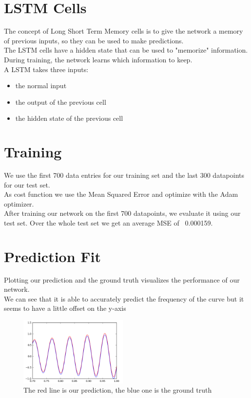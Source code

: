 \documentclass[twoside, twocolumn]{article}
\begin{document}

\section{LSTM Cells}
The concept of Long Short Term Memory cells is to give the network a memory of previous inputs, so they can be used to make predictions. \\
The LSTM cells have a hidden state that can be used to "memorize" information. During training, the network learns which information to keep. \\
A LSTM takes three inputs:
\begin{itemize}
\item the normal input
\item the output of the previous cell
\item the hidden state of the previous cell
\end{itemize}


\section{Training}
We use the first 700 data entries for our training set and the last 300 datapoints for our test set. \\
As cost function we use the Mean Squared Error and optimize with the Adam optimizer. \\
After training our network on the first 700 datapoints, we evaluate it using our test set. Over the whole test set we get an average MSE of ~0.000159.


\section{Prediction Fit}
Plotting our prediction and the ground truth visualizes the performance of our network. \\
We can see that it is able to accurately predict the frequency of the curve but it seems to have a little offset on the y-axis

\begin{figure}[htb]
\centering
	\includegraphics[width=0.48\textwidth]{rnn_fit.png}
	\caption{The red line is our prediction, the blue one is the ground truth}
\end{figure}
\end{document}
